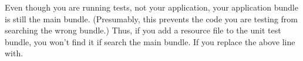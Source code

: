 

Even though you are
running tests, not
your application,
your application
bundle is still the
main bundle.
(Presumably, this
prevents the code
you are testing from
searching the wrong
bundle.) Thus, if
you add a resource
file to the unit
test bundle, you
won't find it if
search the main
bundle. If you
replace the above
line with.
